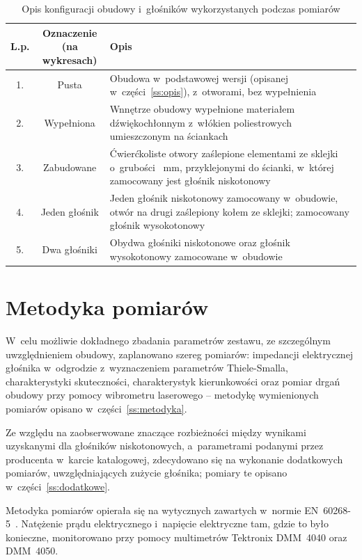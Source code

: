 \documentclass[12pt]{oska}
\begin{document}
		\begin{table}[!ht]
			\centering
			\caption{Opis konfiguracji obudowy i~głośników wykorzystanych podczas pomiarów}
			\label{t:obudowa}
			\begin{tabular}{|c|c|m{}|}
				\hline
				\textbf{L.p.} & \makecell{\textbf{Oznaczenie}\\\textbf{(na wykresach)}} & \centering\textbf{Opis} \tabularnewline\hline
				1. & Pusta & Obudowa w~podstawowej wersji (opisanej w~części~\ref{ss:opis}), z~otworami, bez wypełnienia \\\hline
				2. & Wypełniona & Wnnętrze obudowy wypełnione materiałem dźwiękochłonnym z~włókien poliestrowych umieszczonym na ściankach \\\hline
				3. & Zabudowane & Ćwierćkoliste otwory zaślepione elementami ze sklejki o~grubości \SI{}{\milli\metre}, przyklejonymi do ścianki, w~której zamocowany jest głośnik niskotonowy\\\hline
				\hline
				4. & Jeden głośnik & Jeden głośnik niskotonowy zamocowany w~obudowie, otwór na drugi zaślepiony kołem ze sklejki; zamocowany głośnik wysokotonowy \\\hline
				5. & Dwa głośniki & Obydwa głośniki niskotonowe oraz głośnik wysokotonowy zamocowane w~obudowie\\\hline
			\end{tabular}
		\end{table}

\section{Metodyka pomiarów}

	W~celu możliwie dokładnego zbadania parametrów zestawu, ze szczególnym uwzględnieniem obudowy, zaplanowano szereg pomiarów: impedancji elektrycznej głośnika w~odgrodzie z~wyznaczeniem parametrów Thiele-Smalla, charakterystyki skuteczności, charakterystyk kierunkowości oraz pomiar drgań obudowy przy pomocy wibrometru laserowego -- metodykę wymienionych pomiarów opisano w~części~\ref{ss:metodyka}.
	
	Ze względu na zaobserwowane znaczące rozbieżności między wynikami uzyskanymi dla głośników niskotonowych, a~parametrami podanymi przez producenta w~karcie katalogowej, zdecydowano się na wykonanie dodatkowych pomiarów, uwzględniających zużycie głośnika; pomiary te opisano w~części~\ref{ss:dodatkowe}.
	
	Metodyka pomiarów opierała się na wytycznych zawartych w~normie EN~60268-5~\cite{norma}. Natężenie prądu elektrycznego i~napięcie elektryczne tam, gdzie to było konieczne, monitorowano przy pomocy multimetrów Tektronix DMM~4040 oraz DMM~4050.
\end{document}
